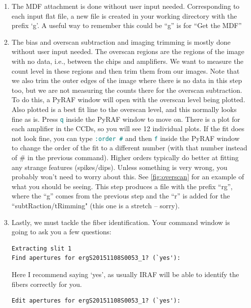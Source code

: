 \documentclass[12pt]{report}
\newcommand{\ty}[1]{\textcolor{teal}{\texttt{#1}}}
\begin{document}
\begin{enumerate}
\item The MDF attachment is done without user input needed. Corresponding to each input flat file, a new file is created in your working directory with the prefix `g'. A useful way to remember this could be ``g'' is for ``Get the MDF''
\item The bias and overscan subtraction and imaging trimming is mostly done without user input needed. The overscan regions are the regions of the image with no data, i.e., between the chips and amplifiers. We want to measure the count level in these regions and then trim them from our images.  Note that we also trim the outer edges of the image where there is no data in this step too, but we are not measuring the counts there for the overscan subtraction. To do this, a PyRAF window will open with the overscan level being plotted. Also plotted is a best fit line to the overscan level, and this normally looks fine as is. Press \ty{q} inside the PyRAF window to move on. There is a plot for each amplifier in the CCDs, so you will see 12 individual plots. If the fit does not look fine, you can type \ty{:order \#} and then \ty{f} inside the PyRAF window to change the order of the fit to a different number (with that number instead of \# in the previous command). Higher orders typically do better at fitting any strange features (spikes/dips). Unless something is very wrong, you probably won't need to worry about this. See \autoref{fig:overscan} for an example of what you should be seeing. This step produces a file with the prefix ``rg'', where the ``g'' comes from the previous step and the ``r'' is added for the ``subtRaction/tRimming" (this one is a stretch -- sorry).
\item Lastly, we must tackle the fiber identification. Your command window is going to ask you a few questions:
\begin{verbatim}
Extracting slit 1
Find apertures for ergS20151108S0053_1? (`yes'): 
\end{verbatim}
Here I recommend saying `yes', as usually IRAF will be able to identify the fibers correctly for you. 
\begin{verbatim}
Edit apertures for ergS20151108S0053_1? (`yes'): 
\end{verbatim}

\end{enumerate}
\end{document}
